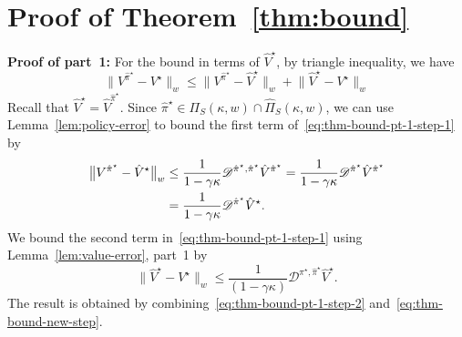 \documentclass[letterpaper, 10pt]{IEEEtran}
\newcommand*\MISMATCH{\mathscr{D}}
\newcommand*\tuple{\kappa, w}
\begin{document}
\section{Proof of Theorem~\ref{thm:bound}}\label{app:thm:bound}
\textbf{Proof of part~1:}
For the bound in terms of $\hat V^\star$, by triangle inequality, we have
\begin{equation}\label{eq:thm-bound-pt-1-step-1}
    \bigl\| V^{\hat \pi ^\star} - V^\star \bigr\|_w \leq 
        \bigl\|V^{\hat \pi ^\star} - \hat V ^\star \bigr\|_w + \bigl\| \hat V ^\star - V ^\star \bigr\|_w
\end{equation}
Recall that $\hat V^\star = \hat V^{\hat \pi^\star}$. Since $\hat \pi^\star \in \Pi_S(\tuple) \cap \hat \Pi_S(\tuple)$, we can use Lemma~\ref{lem:policy-error} to bound the first term of~\eqref{eq:thm-bound-pt-1-step-1} by
\begin{align}\label{eq:thm-bound-pt-1-step-2}
    \bigl\|V^{\hat \pi ^\star} - \hat V ^\star \bigr\|_w 
    &\le 
    \frac{1}{1- \gamma\kappa} \MISMATCH^{\hat \pi^\star,\hat\pi^\star} \hat V^{\hat \pi^\star} =
    \frac{1}{1- \gamma\kappa} \MISMATCH^{\hat \pi^\star} \hat V^{\hat \pi^\star} \notag \\
    &=
    \frac{1}{1- \gamma\kappa} \MISMATCH^{\hat \pi^\star} \hat V^{\star} .
\end{align}
We bound the second term in~\eqref{eq:thm-bound-pt-1-step-1} using Lemma~\ref{lem:value-error}, part~1 by
\begin{equation}\label{eq:thm-bound-new-step}
    \|\hat V^\star-V^\star  \|_w \le \frac 1{(1 - \gamma \kappa)} \MISMATCH^{\pi^\star, \hat \pi^\star} \hat V^\star.
\end{equation}
The result is obtained by combining~\eqref{eq:thm-bound-pt-1-step-2} and~\eqref{eq:thm-bound-new-step}.
\end{document}
